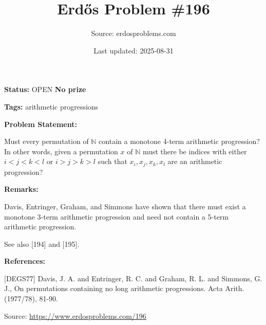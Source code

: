 \documentclass{article}
\title{Erd\H{o}s Problem \#196}
\date{Last updated: 2025-08-31}
\author{Source: erdosproblems.com}
\begin{document}
\maketitle

\noindent\textbf{Status:} OPEN \quad \textbf{No prize}

\noindent\textbf{Tags:} arithmetic progressions

\medskip
\noindent\textbf{Problem Statement:}

Must every permutation of $\mathbb{N}$ contain a monotone 4-term arithmetic progression? In other words, given a permutation $x$ of $\mathbb{N}$ must there be indices with either $i<j<k<l$ or $i>j>k>l$ such that $x_i,x_j,x_k,x_l$ are an arithmetic progression?

\bigskip
\noindent\textbf{Remarks:}

Davis, Entringer, Graham, and Simmons \cite{DEGS77} have shown that there must exist a monotone 3-term arithmetic progression and need not contain a 5-term arithmetic progression.

See also [194] and [195].

\bigskip
\noindent\textbf{References:}

[DEGS77] Davis, J. A. and Entringer, R. C. and Graham, R. L. and
Simmons, G. J., On permutations containing no long arithmetic progressions. Acta Arith. (1977/78), 81-90.

\bigskip
\noindent\small{Source: \url{https://www.erdosproblems.com/196}}
\end{document}
